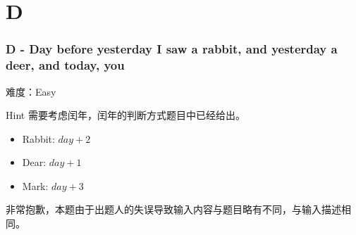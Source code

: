\section{D}
\begin{frame}
\frametitle{D - Day before yesterday I saw a rabbit, and yesterday a deer, and today, you}
难度：Easy

\begin{block}{Hint}
    需要考虑闰年，闰年的判断方式题目中已经给出。
\end{block}

\begin{itemize}
    \item Rabbit: $day + 2$
    \item Dear: $day + 1$
    \item Mark: $day + 3$
\end{itemize}

非常抱歉，本题由于出题人的失误导致输入内容与题目略有不同，与输入描述相同。
\end{frame}